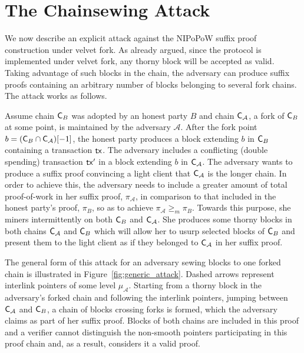 \section{The Chainsewing Attack}\label{sec:attack}
We now describe an explicit attack against the NIPoPoW suffix proof construction under velvet fork. As already argued, since the protocol is implemented under velvet fork, any thorny block will be accepted as valid. Taking advantage of such blocks in the chain, the adversary can produce suffix proofs containing an arbitrary number of blocks belonging to several fork chains. The attack works as follows.

Assume chain $\mathsf{C}_B$ was adopted by an honest party $B$ and chain $\mathsf{C}_\mathcal{A}$, a fork of $\mathsf{C}_B$ at some point, is maintained by the adversary $\mathcal{A}$. After the fork point $b = (\mathsf{C}_B \cap \mathsf{C}_\mathcal{A})[-1]$, the honest party produces a block extending $b$ in $\mathsf{C}_B$ containing a transaction $\mathsf{tx}$. The adversary includes a conflicting (double spending) transaction $\mathsf{tx}'$ in a block extending $b$ in $\mathsf{C}_\mathcal{A}$.
The adversary wants to produce a suffix proof convincing a light client that $\mathsf{C}_\mathcal{A}$ is the longer chain. In order to achieve this, the adversary needs to include a greater amount of total proof-of-work in her suffix proof, $\pi_\mathcal{A}$, in comparison to that included in the honest party's proof, $\pi_B$, so as to achieve $\pi_\mathcal{A} \geq_m \pi_B$. Towards this purpose, she miners intermittently on both $\mathsf{C}_B$ and $\mathsf{C}_\mathcal{A}$. She produces some thorny blocks in both chains $\mathsf{C}_\mathcal{A}$ and $\mathsf{C}_B$ which will allow her to usurp selected blocks of $\mathsf{C}_B$ and present them to the light client as if they belonged to $\mathsf{C}_\mathcal{A}$ in her suffix proof.

The general form of this attack for an adversary sewing blocks to one forked chain is illustrated in Figure~\ref{fig:generic_attack}. Dashed arrows represent interlink pointers of some level $\mu_\mathcal{A}$. Starting from a thorny block in the adversary's forked chain and following the interlink pointers, jumping between $\mathsf{C}_\mathcal{A}$ and $\mathsf{C}_B$, a chain of blocks crossing forks is formed, which the adversary claims as part of her suffix proof. Blocks of both chains are included in this proof and a verifier cannot distinguish the non-smooth pointers participating in this proof chain and, as a result, considers it a valid proof.

